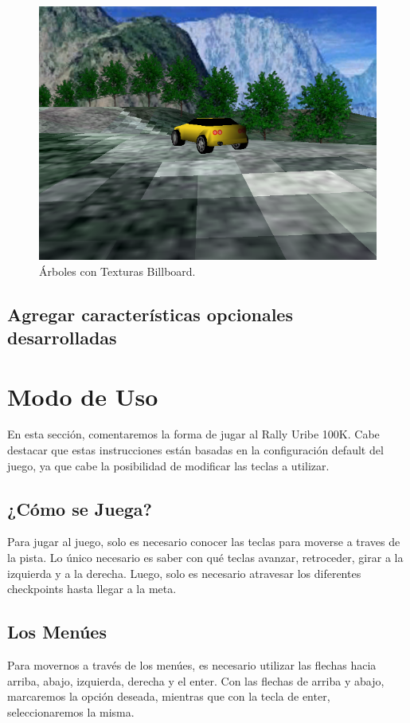 \documentclass[a4paper,10pt]{article}
\begin{document}
\begin{figure}
 \centering
 \includegraphics[scale=0.4]{./billboard.png}
 \caption{Árboles con Texturas Billboard.}
 \label{fig:figure7}
\end{figure}


\subsection{Agregar características opcionales desarrolladas}

\section{Modo de Uso}
\label{mododeuso}
En esta sección, comentaremos la forma de jugar al Rally Uribe 100K.  Cabe
destacar que estas instrucciones están basadas en la configuración default del
juego, ya que cabe la posibilidad de modificar las teclas a utilizar.

\subsection{¿Cómo se Juega?}
Para jugar al juego, solo es necesario conocer las teclas para moverse a traves
de la pista.  Lo único necesario es saber con qué teclas avanzar, retroceder,
girar a la izquierda y a la derecha.  Luego, solo es necesario atravesar los
diferentes checkpoints hasta llegar a la meta.

\subsection{Los Menúes}
Para movernos a través de los menúes, es necesario utilizar las flechas hacia
arriba, abajo, izquierda, derecha y el enter.  Con las flechas de arriba y
abajo, marcaremos la opción deseada, mientras que con la tecla de enter,
seleccionaremos la misma.
\end{document}
